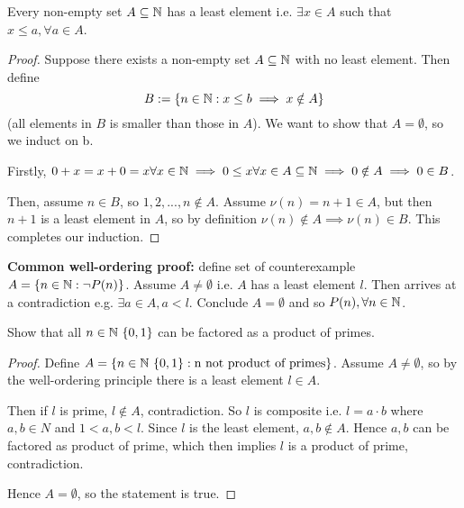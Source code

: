 \documentclass[11pt]{article}
\begin{document}
\begin{proposition}
  Every non-empty set \(A \subseteq \mathbb{N}\) has a least element i.e. \(\exists x \in A\) such that \(x \leq a, \forall a \in A\).
\end{proposition}
\begin{proof}
  Suppose there exists a non-empty set \(A \subseteq \mathbb{N}\) with no least element. Then define
  \begin{equation*}
    B:= \{n \in \mathbb{N} : x\leq b \implies x \notin A\}
  \end{equation*}
  (all elements in \(B\) is smaller than those in \(A\)). We want to show that \(A = \emptyset\), so we induct on b.

  Firstly, \(0+x=x+0=x \forall x \in \mathbb{N} \implies 0\leq x \forall x \in A \subseteq \mathbb{N} \implies 0 \notin A \implies 0 \in B\).

  Then, assume \(n \in B\), so \(1,2,...,n \notin A\). Assume \(\nu(n)=n+1 \in A\), but then \(n+1\) is a least element in \(A\), so by definition \(\nu(n) \notin A \implies \nu(n) \in B\). This completes our induction.
\end{proof}

\textbf{Common well-ordering proof:} define set of counterexample \(A = \{n \in \mathbb{N}: \lnot P(n)\}\). Assume \(A \neq \emptyset\) i.e. \(A\) has a least element \(l\). Then arrives at a contradiction e.g. \(\exists a \in A, a < l\). Conclude \(A = \emptyset\) and so \(P(n),  \forall n \in \mathbb{N}\).

\begin{example}
  Show that all \(n \in \mathbb{N} \ \{0,1\}\) can be factored as a product of primes.
\end{example}
\begin{proof}
  Define \(A = \{n\in \N \ \{0,1\}: \text{n not product of primes}\}\). Assume \(A \neq \emptyset\), so by the well-ordering principle there is a least element \(l \in A\). 
  
  Then if \(l\) is prime, \(l \notin A\), contradiction. So \(l\) is composite i.e. \(l=a \cdot b\) where \(a,b \in N\) and \(1 < a,b < l\). Since \(l\) is the least element, \(a,b \notin A\). Hence \(a,b\) can be factored as product of prime, which then implies \(l\) is a product of prime, contradiction. 

  Hence \(A = \emptyset\), so the statement is true.
\end{proof}
\end{document}
